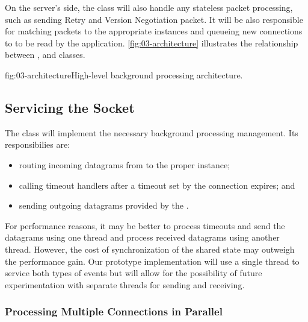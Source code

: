 On the server's side, the \QuicSocketContext{} class will also handle any stateless packet
processing, such as sending Retry and Version Negotiation packet. It will be also responsible for
matching packets to the appropriate \QuicConnection{} instances and queueing new connections to
\QuicListener{} to be read by the application. \autoref{fig:03-architecture} illustrates the
relationship between \QuicSocketContext{}, \QuicConnection{} and \QuicListener{} classes.

\begin{myFigure}{fig:03-architecture}{High-level background processing architecture.}

\resizebox{0.76\textwidth}{!}{}

\end{myFigure}

\subsection{Servicing the Socket}

The \QuicSocketContext{} class will implement the necessary background processing management. Its
responsibilies are:

\begin{itemize}

  \item routing incoming datagrams from \Socket{} to the proper \QuicConnection{} instance;

  \item calling timeout handlers after a timeout set by the connection expires; and

  \item sending outgoing datagrams provided by the \QuicConnection{}.

\end{itemize}

For performance reasons, it may be better to process timeouts and send the datagrams using one
thread and process received datagrams using another thread. However, the cost of synchronization of
the shared state may outweigh the performance gain. Our prototype implementation will use a single
thread to service both types of events but will allow for the possibility of future experimentation
with separate threads for sending and receiving.

\subsubsection{Processing Multiple Connections in Parallel}


